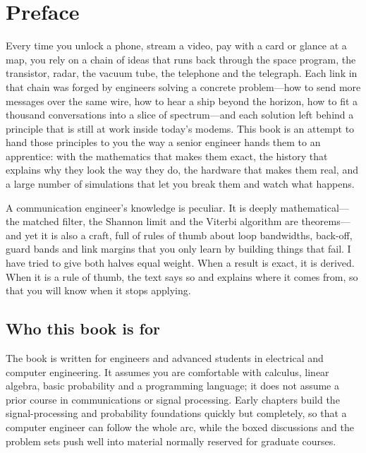 \chapter*{Preface}

Every time you unlock a phone, stream a video, pay with a card or glance at a map, you
rely on a chain of ideas that runs back through the space program, the transistor, radar,
the vacuum tube, the telephone and the telegraph. Each link in that chain was forged by
engineers solving a concrete problem---how to send more messages over the same wire, how
to hear a ship beyond the horizon, how to fit a thousand conversations into a slice of
spectrum---and each solution left behind a principle that is still at work inside
today's modems. This book is an attempt to hand those principles to you the way a senior
engineer hands them to an apprentice: with the mathematics that makes them exact, the
history that explains why they look the way they do, the hardware that makes them real,
and a large number of simulations that let you break them and watch what happens.

A communication engineer's knowledge is peculiar. It is deeply mathematical---the
matched filter, the Shannon limit and the Viterbi algorithm are theorems---and yet it is
also a craft, full of rules of thumb about loop bandwidths, back-off, guard bands and
link margins that you only learn by building things that fail. I have tried to give both
halves equal weight. When a result is exact, it is derived. When it is a rule of thumb,
the text says so and explains where it comes from, so that you will know when it stops
applying.

\section*{Who this book is for}
The book is written for engineers and advanced students in electrical and computer
engineering. It assumes you are comfortable with calculus, linear algebra, basic
probability and a programming language; it does not assume a prior course in
communications or signal processing. Early chapters build the signal-processing and
probability foundations quickly but completely, so that a computer engineer can follow
the whole arc, while the boxed discussions and the problem sets push well into material
normally reserved for graduate courses.

